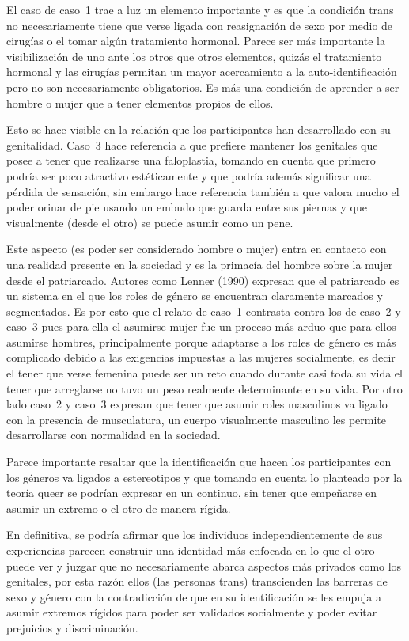 El caso de caso~1 trae a luz un elemento importante y es que la condición
trans no necesariamente tiene que verse ligada con reasignación de sexo por
medio de cirugías o el tomar algún tratamiento hormonal. Parece ser más
importante la visibilización de uno ante los otros que otros elementos, quizás
el tratamiento hormonal y las cirugías permitan un mayor acercamiento a la
auto-identificación pero no son necesariamente obligatorios. Es más una
condición de aprender a ser hombre o mujer que a tener elementos propios de
ellos.

Esto se hace visible en la relación que los participantes han desarrollado con
su genitalidad. Caso~3 hace referencia a que prefiere mantener los genitales
que posee a tener que realizarse una faloplastia, tomando en cuenta que primero
podría ser poco atractivo estéticamente y que podría además significar una
pérdida de sensación, sin embargo hace referencia también a que valora mucho el
poder orinar de pie usando un embudo que guarda entre sus piernas y que
visualmente (desde el otro) se puede asumir como un pene.

Este aspecto (es poder ser considerado hombre o mujer) entra en contacto con una
realidad presente en la sociedad y es la primacía del hombre sobre la mujer
desde el patriarcado. Autores como Lenner (1990) expresan que el patriarcado es
un sistema en el que los roles de género se encuentran claramente marcados y
segmentados. Es por esto que el relato de caso~1 contrasta contra los de
caso~2 y caso~3 pues para ella el asumirse mujer fue un proceso más arduo
que para ellos asumirse hombres, principalmente porque adaptarse a los roles de
género es más complicado debido a las exigencias impuestas a las mujeres
socialmente, es decir el tener que verse femenina puede ser un reto cuando
durante casi toda su vida el tener que arreglarse no tuvo un peso realmente
determinante en su vida. Por otro lado caso~2 y caso~3 expresan que tener
que asumir roles masculinos va ligado con la presencia de musculatura, un cuerpo
visualmente masculino les permite desarrollarse con normalidad en la sociedad.

Parece importante resaltar que la identificación que hacen los participantes con
los géneros va ligados a estereotipos y que tomando en cuenta lo planteado por
la teoría queer se podrían expresar en un continuo, sin tener que empeñarse en
asumir un extremo o el otro de manera rígida.

En definitiva, se podría afirmar que los individuos independientemente de sus
experiencias parecen construir una identidad más enfocada en lo que el otro
puede ver y juzgar que no necesariamente abarca aspectos más privados como los
genitales,  por esta razón ellos (las personas trans) transcienden las barreras
de sexo y género con la contradicción de que en su identificación se les empuja
a asumir extremos rígidos para poder ser validados socialmente y poder evitar
prejuicios y discriminación.

